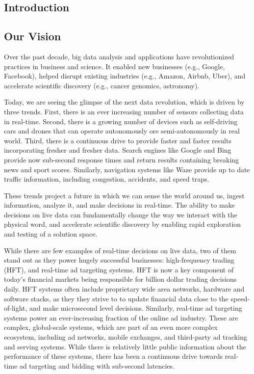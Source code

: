 \documentclass [10pt]{article}
\begin{document}
\begin{outline}
\section{Introduction}

\subsection{Our Vision} 

Over the past decade, big data analysis and applications have revolutionized practices in business and science. It enabled new businesses (e.g., Google, Facebook), helped disrupt existing industries (e.g., Amazon, Airbnb, Uber), and accelerate scientific discovery (e.g., cancer genomics, astronomy).

Today, we are seeing the glimpse of the next data revolution, which is driven by three trends. First, there is an ever increasing number of sensors collecting data in real-time. Second, there is a growing number of devices such as self-driving cars and drones that can operate autonomously ore semi-autonomously in real world. Third, there is a continuous drive to provide faster and faster results incorporating fresher and fresher data. Search engines like Google and Bing provide now sub-second response times and return results containing breaking news and sport scores. Similarly, navigation systems like Waze provide up to date traffic information, including congestion, accidents, and speed traps.

These trends project a future in which we can sense the world around us, ingest information, analyze it, and make decisions in real-time. The ability to make decisions on live data can fundamentally change the way we interact with the physical word, and accelerate scientific discovery by enabling rapid exploration and testing of a solution space.

While there are few examples of real-time decisions on live data, two of them stand out as they power hugely successful businesses: high-frequency trading (HFT), and real-time ad targeting systems. HFT is now a key component of today’s financial markets being responsible for billion dollar trading decisions daily. HFT systems often include proprietary wide area networks, hardware and software stacks, as they they strive to to update financial data close to the speed-of-light, and make microsecond level decisions. Similarly, real-time ad targeting systems power an ever-increasing fraction of the online ad industry. These are complex, global-scale systems, which are part of an even more complex ecosystem, including ad networks, mobile exchanges, and third-party ad tracking and serving systems. While there is relatively little public information about the performance of these systems, there has been a continuous drive towards real-time ad targeting and bidding with sub-second latencies.


\end{outline}
\end{document}

